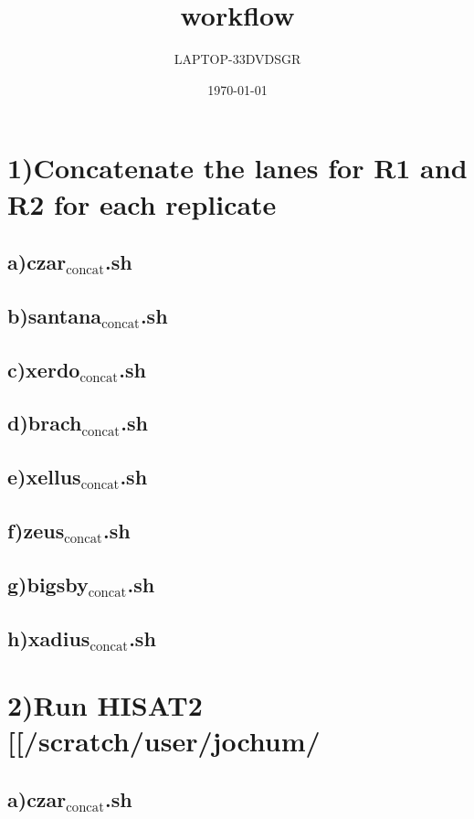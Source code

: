 \documentclass[11pt]{article}
\author{LAPTOP-33DVDSGR}
\date{\today}
\title{workflow}
\begin{document}
\maketitle
\tableofcontents

\section{1)Concatenate the lanes for R1 and R2  for each replicate}
\label{sec-1}
\subsection{a)czar$_{\text{concat}}$.sh}
\label{sec-1-1}
\subsection{b)santana$_{\text{concat}}$.sh}
\label{sec-1-2}
\subsection{c)xerdo$_{\text{concat}}$.sh}
\label{sec-1-3}
\subsection{d)brach$_{\text{concat}}$.sh}
\label{sec-1-4}
\subsection{e)xellus$_{\text{concat}}$.sh}
\label{sec-1-5}
\subsection{f)zeus$_{\text{concat}}$.sh}
\label{sec-1-6}
\subsection{g)bigsby$_{\text{concat}}$.sh}
\label{sec-1-7}
\subsection{h)xadius$_{\text{concat}}$.sh}
\label{sec-1-8}
\section{2)Run HISAT2 [[/scratch/user/jochum/}
\label{sec-2}
\subsection{a)czar$_{\text{concat}}$.sh}
\label{sec-2-1}
\end{document}
